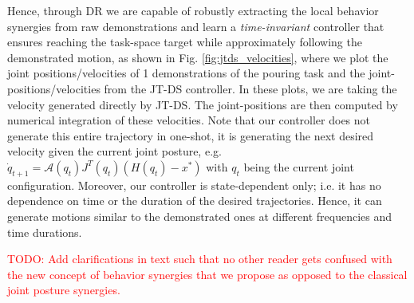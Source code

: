 \documentclass{article}
\begin{document}
\begin{enumerate}
Hence, through DR we are capable of robustly extracting the local behavior synergies from raw demonstrations and learn a \textit{time-invariant} controller that ensures reaching the task-space target while approximately following the demonstrated motion, as shown in Fig. \ref{fig:jtds_velocities}, where we plot the joint positions/velocities of 1 demonstrations of the pouring task and the joint-positions/velocities from the JT-DS controller. In these plots, we are taking the velocity generated directly by JT-DS. The joint-positions are then computed by numerical integration of these velocities. Note that our controller does not generate this entire trajectory in one-shot, it is generating the next desired velocity given the current joint posture, e.g. $\dot{q}_{t+1} = \mathcal{A}(q_{t})J^T(q_{t})(H(q_{t})-x^*)$ with $q_t$ being the current joint configuration. Moreover, our controller is state-dependent only; i.e. it has no dependence on time or the duration of the desired trajectories. Hence, it can generate motions similar to the demonstrated ones at different frequencies and time durations. 

\noindent \textcolor{red}{TODO: Add clarifications in text such that no other reader gets confused with the new concept of behavior synergies that we propose as opposed to the classical joint posture synergies.}




\end{enumerate}
\end{document}
